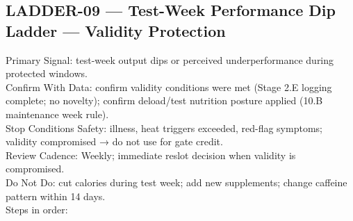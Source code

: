 \documentclass[10pt]{article}
\begin{document}
\newpage

\subsection*{LADDER-09 — Test-Week Performance Dip Ladder — Validity Protection}
{}

Primary Signal: test-week output dips or perceived underperformance during protected windows.\\
Confirm With Data: confirm validity conditions were met (Stage 2.E logging complete; no novelty); confirm deload/test nutrition posture applied (10.B maintenance week rule).\\
Stop Conditions Safety: illness, heat triggers exceeded, red-flag symptoms; validity compromised → do not use for gate credit.\\
Review Cadence: Weekly; immediate reslot decision when validity is compromised.\\
Do Not Do: cut calories during test week; add new supplements; change caffeine pattern within 14 days.\\
Steps in order:
\end{document}
